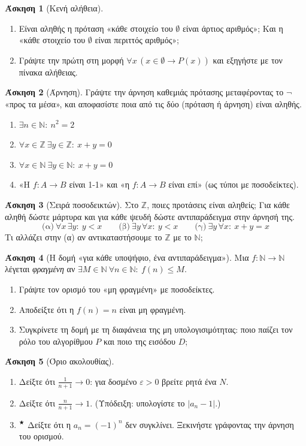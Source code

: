 \documentclass[11pt,a4paper]{article}
\theoremstyle{definition}
\newtheorem{question}{Άσκηση}
\newcommand{\N}{\mathbb{N}}
\newcommand{\Z}{\mathbb{Z}}
\newcommand{\st}{$^{\bigstar}$}  %
\newcommand{\gi}[1]{\item[(#1)]}
\begin{document}
\begin{question}[Κενή αλήθεια]
\begin{enumerate}[itemsep=0pt]
\gi{α} Είναι αληθής η πρόταση «κάθε στοιχείο του $\emptyset$ είναι άρτιος αριθμός»; Και η
«κάθε στοιχείο του $\emptyset$ είναι περιττός αριθμός»;
\gi{β} Γράψτε την πρώτη στη μορφή $\forall x\,(x\in\emptyset\to P(x))$ και εξηγήστε με τον πίνακα αλήθειας.
\end{enumerate}
\end{question}


\begin{question}[Άρνηση]
Γράψτε την άρνηση καθεμιάς πρότασης μεταφέροντας το $\neg$ «προς τα μέσα», και αποφασίστε ποια
από τις δύο (πρόταση ή άρνηση) είναι αληθής.
\begin{enumerate}[itemsep=0pt]
\gi{α} $\exists n\in\N:\ n^2=2$
\gi{β} $\forall x\in\Z\ \exists y\in\Z:\ x+y=0$
\gi{γ} $\forall x\in\N\ \exists y\in\N:\ x+y=0$
\gi{δ} «Η $f:A\to B$ είναι 1-1» και «η $f:A\to B$ είναι επί» (ως τύποι με ποσοδείκτες).
\end{enumerate}
\end{question}


\begin{question}[Σειρά ποσοδεικτών]
Στο $\Z$, ποιες προτάσεις είναι αληθείς; Για κάθε αληθή δώστε μάρτυρα και για κάθε ψευδή
δώστε αντιπαράδειγμα στην άρνησή της.
\[
\text{(α)}\ \forall x\,\exists y:\ y<x \qquad
\text{(β)}\ \exists y\,\forall x:\ y<x \qquad
\text{(γ)}\ \exists y\,\forall x:\ x+y=x
\]
Τι αλλάζει στην (α) αν αντικαταστήσουμε το $\Z$ με το $\N$;
\end{question}


\begin{question}[Η δομή «για κάθε υποψήφιο, ένα αντιπαράδειγμα»]
Μια $f:\N\to\N$ λέγεται \emph{φραγμένη} αν $\exists M\in\N\ \forall n\in\N:\ f(n)\le M$.
\begin{enumerate}[itemsep=0pt]
\gi{α} Γράψτε τον ορισμό του «μη φραγμένη» με ποσοδείκτες.
\gi{β} Αποδείξτε ότι η $f(n)=n$ είναι μη φραγμένη.
\gi{γ} Συγκρίνετε τη δομή με τη διαφάνεια της μη υπολογισιμότητας: ποιο παίζει τον ρόλο του
αλγορίθμου $P$ και ποιο της εισόδου $D$;
\end{enumerate}
\end{question}


\begin{question}[Όριο ακολουθίας]
\begin{enumerate}[itemsep=0pt]
\gi{α} Δείξτε ότι $\frac{1}{n+1}\to0$: για δοσμένο $\varepsilon>0$ βρείτε ρητά ένα $N$.
\gi{β} Δείξτε ότι $\frac{n}{n+1}\to1$. (Υπόδειξη: υπολογίστε το $|a_n-1|$.)
\gi{γ} \st{} Δείξτε ότι η $a_n=(-1)^n$ δεν συγκλίνει. Ξεκινήστε γράφοντας την άρνηση του ορισμού.
\end{enumerate}
\end{question}
\end{document}
